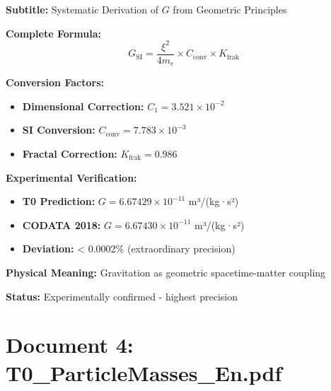 \documentclass[12pt,a4paper]{article}
\newcommand{\xipar}{\xi}
\begin{document}
	\begin{documentbox}
		\textbf{Subtitle:} Systematic Derivation of $G$ from Geometric Principles
		
		\textbf{Complete Formula:}
		\begin{equation}
			\boxed{G_{\text{SI}} = \frac{\xipar^2}{4 m_e} \times C_{\text{conv}} \times K_{\text{frak}}}
		\end{equation}
		
		\textbf{Conversion Factors:}
		\begin{itemize}
			\item \textbf{Dimensional Correction:} $C_1 = 3.521 \times 10^{-2}$ 
			\item \textbf{SI Conversion:} $C_{\text{conv}} = 7.783 \times 10^{-3}$
			\item \textbf{Fractal Correction:} $K_{\text{frak}} = 0.986$
		\end{itemize}
		
		\textbf{Experimental Verification:}
		\begin{itemize}
			\item \textbf{T0 Prediction:} $G = 6.67429 \times 10^{-11}$ m³/(kg·s²)
			\item \textbf{CODATA 2018:} $G = 6.67430 \times 10^{-11}$ m³/(kg·s²)
			\item \textbf{Deviation:} < 0.0002\% (extraordinary precision)
		\end{itemize}
		
		\textbf{Physical Meaning:} Gravitation as geometric spacetime-matter coupling
		
		\textbf{Status:} Experimentally confirmed - highest precision
	\end{documentbox}
	
	\section{Document 4: T0\_ParticleMasses\_En.pdf}
	
\end{document}
